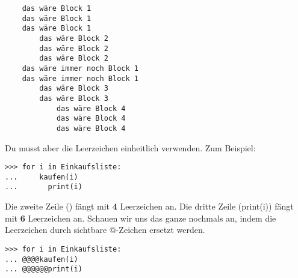 \begin{listing}
\begin{verbatim}
    das wäre Block 1
    das wäre Block 1
    das wäre Block 1
        das wäre Block 2
        das wäre Block 2
        das wäre Block 2
    das wäre immer noch Block 1
    das wäre immer noch Block 1
        das wäre Block 3
        das wäre Block 3
            das wäre Block 4
            das wäre Block 4
            das wäre Block 4
\end{verbatim}
\end{listing}
Du musst aber die Leerzeichen einheitlich verwenden. Zum Beispiel:

\begin{listingignore}
\begin{verbatim}
>>> for i in Einkaufsliste:
...     kaufen(i)
...       print(i)
\end{verbatim}
\end{listingignore}

Die zweite Zeile () fängt mit \textbf{4} Leerzeichen an. Die dritte Zeile (print(i)) fängt mit \textbf{6} Leerzeichen an. Schauen wir uns das ganze nochmals an, indem die Leerzeichen durch sichtbare @-Zeichen ersetzt werden.

\begin{listingignore}
\begin{verbatim}
>>> for i in Einkaufsliste:
... @@@@kaufen(i)
... @@@@@@print(i)
\end{verbatim}
\end{listingignore}

